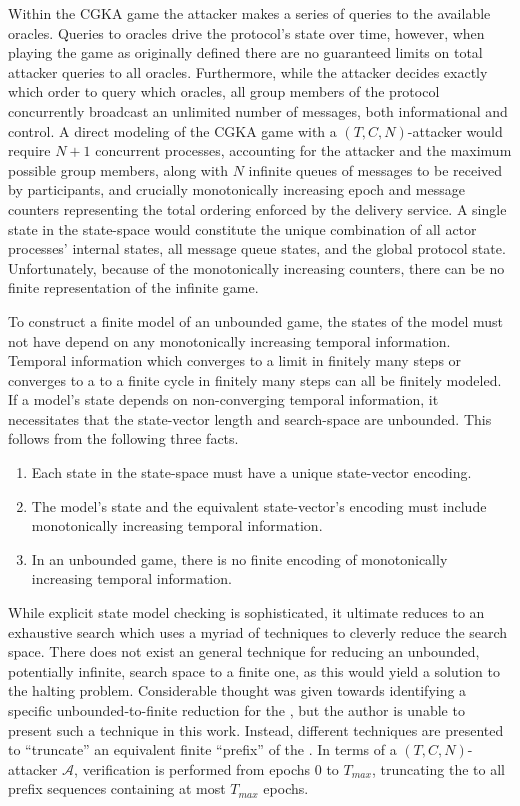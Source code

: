 Within the CGKA game the attacker makes a series of queries to the available oracles.
Queries to oracles drive the  protocol's state over time, however, when playing the game as originally defined there are no guaranteed limits on total attacker queries to all oracles.
Furthermore, while the attacker decides exactly which order to query which oracles, all group members of the  protocol concurrently broadcast an unlimited number of messages, both informational and control.
A direct modeling of the CGKA game with a \((T, C, N)\)-attacker would require \(N+1\) concurrent processes, accounting for the attacker and the maximum possible group members, along with \(N\) infinite queues of messages to be received by participants, and crucially monotonically increasing epoch and message counters representing the total ordering enforced by the delivery service.
A single state in the state-space would constitute the unique combination of all actor processes' internal states, all message queue states, and the global protocol state.
Unfortunately, because of the monotonically increasing counters, there can be no finite representation of the infinite game.

To construct a finite model of an unbounded game, the states of the model must not have depend on any monotonically increasing temporal information.
Temporal information which converges to a limit in finitely many steps or converges to a to a finite cycle in finitely many steps can all be finitely modeled.
If a model's state depends on non-converging temporal information, it necessitates that the state-vector length and search-space are unbounded.
This follows from the following three facts.

\begin{enumerate}
\def\labelenumi{\arabic{enumi}.}
\item
  Each state in the state-space must have a unique state-vector encoding.
\item
  The model's state and the equivalent state-vector's encoding must include monotonically increasing temporal information.
\item
  In an unbounded game, there is no finite encoding of monotonically increasing temporal information.
\end{enumerate}

While explicit state model checking is sophisticated, it ultimate reduces to an exhaustive search which uses a myriad of techniques to cleverly reduce the search space.
There does not exist an general technique for reducing an unbounded, potentially infinite, search space to a finite one, as this would yield a solution to the halting problem.
Considerable thought was given towards identifying a specific unbounded-to-finite reduction for the \CGKAdef, but the author is unable to present such a technique in this work.
Instead, different techniques are presented to ``truncate'' an equivalent finite ``prefix'' of the \CGKAdef.
In terms of a \((T, C, N)\)-attacker \(\mathcal{A}\), verification is performed from epochs $0$ to \(T_{max}\), truncating the \CGKAdef to all prefix sequences containing at most \(T_{max}\) epochs.

